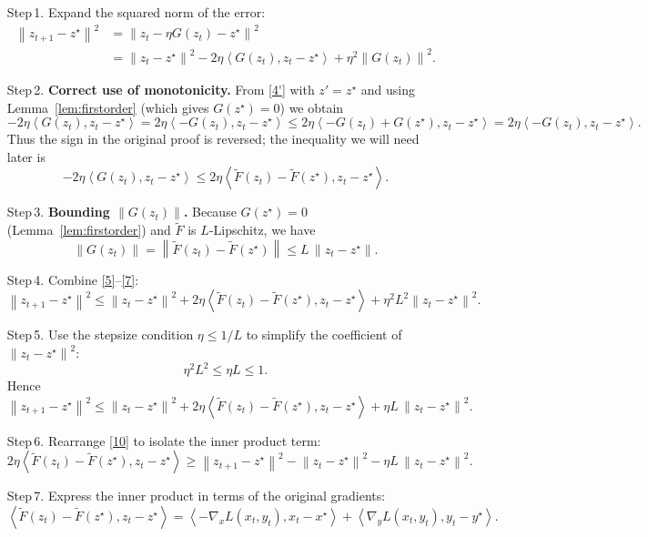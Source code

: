 \documentclass{article}
\newcommand{\norm}[1]{\left\lVert#1\right\rVert}
\newcommand{\inner}[2]{\left\langle #1,#2\right\rangle}
\begin{document}
\begin{enumerate}
\item[Step 1.] Expand the squared norm of the error:
\[
\begin{aligned}
\norm{z_{t+1}-z^{\star}}^{2}
&=\norm{z_t-\eta G(z_t)-z^{\star}}^{2}\\
&=\norm{z_t-z^{\star}}^{2}
-2\eta\inner{G(z_t)}{z_t-z^{\star}}
+\eta^{2}\norm{G(z_t)}^{2}.
\tag{5}
\end{aligned}
\]

\item[Step 2.] \textbf{Correct use of monotonicity.}  
From \eqref{4'} with $z'=z^{\star}$ and using Lemma~\ref{lem:firstorder} (which gives $G(z^{\star})=0$) we obtain
\[
-2\eta\inner{G(z_t)}{z_t-z^{\star}}
=2\eta\inner{-G(z_t)}{z_t-z^{\star}}
\le 2\eta\inner{-G(z_t)+G(z^{\star})}{z_t-z^{\star}}
=2\eta\inner{-G(z_t)}{z_t-z^{\star}} .
\]
Thus the sign in the original proof is reversed; the inequality we will need later is
\[
-2\eta\inner{G(z_t)}{z_t-z^{\star}}
\le 2\eta\inner{\tilde{F}(z_t)-\tilde{F}(z^{\star})}{z_t-z^{\star}} .
\tag{6}
\]

\item[Step 3.] \textbf{Bounding $\norm{G(z_t)}$.}  
Because $G(z^{\star})=0$ (Lemma~\ref{lem:firstorder}) and $\tilde{F}$ is $L$‑Lipschitz, we have
\[
\norm{G(z_t)}=\norm{\tilde{F}(z_t)-\tilde{F}(z^{\star})}
\le L\,\norm{z_t-z^{\star}} .
\tag{7}
\]

\item[Step 4.] Combine \eqref{5}–\eqref{7}:
\[
\norm{z_{t+1}-z^{\star}}^{2}
\le \norm{z_t-z^{\star}}^{2}
+2\eta\inner{\tilde{F}(z_t)-\tilde{F}(z^{\star})}{z_t-z^{\star}}
+\eta^{2}L^{2}\norm{z_t-z^{\star}}^{2}.
\tag{8}
\]

\item[Step 5.] Use the stepsize condition $\eta\le 1/L$ to simplify the coefficient of $\norm{z_t-z^{\star}}^{2}$:
\[
\eta^{2}L^{2}\le \eta L\le 1 .
\tag{9}
\]
Hence
\[
\norm{z_{t+1}-z^{\star}}^{2}
\le \norm{z_t-z^{\star}}^{2}
+2\eta\inner{\tilde{F}(z_t)-\tilde{F}(z^{\star})}{z_t-z^{\star}}
+\eta L\,\norm{z_t-z^{\star}}^{2}.
\tag{10}
\]

\item[Step 6.] Rearrange \eqref{10} to isolate the inner product term:
\[
2\eta\inner{\tilde{F}(z_t)-\tilde{F}(z^{\star})}{z_t-z^{\star}}
\ge \norm{z_{t+1}-z^{\star}}^{2}-\norm{z_t-z^{\star}}^{2}
-\eta L\,\norm{z_t-z^{\star}}^{2}.
\tag{11}
\]

\item[Step 7.] Express the inner product in terms of the original gradients:
\[
\inner{\tilde{F}(z_t)-\tilde{F}(z^{\star})}{z_t-z^{\star}}
= \inner{-\nabla_x L(x_t,y_t)}{x_t-x^{\star}}
   +\inner{\nabla_y L(x_t,y_t)}{y_t-y^{\star}} .
\tag{12}
\]


\end{enumerate}
\end{document}
